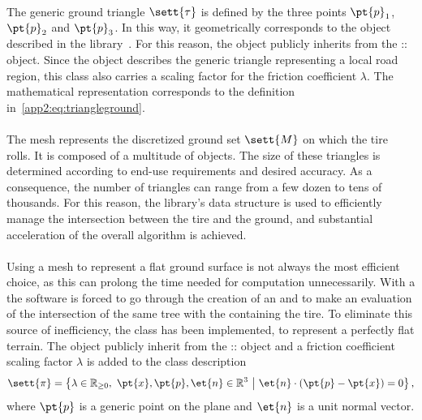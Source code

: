\paragraph{\TriangleGround{}}
The generic ground triangle $\sett{\tau}$ is defined by the three points $\pt{p}_1$, $\pt{p}_2$ and $\pt{p}_3$. In this way, it geometrically corresponds to the \Triangle{} object described in the \Acme{} library~\cite{stocco2021acme}. For this reason, the \TriangleGround{} object publicly inherits from the \Acme{}::\Triangle{} object. Since the \TriangleGround{} object describes the generic triangle representing a local road region, this class also carries a scaling factor for the friction coefficient $\lambda$. The mathematical representation corresponds to the definition in~\eqref{app2:eq:triangleground}.

\paragraph{\Mesh{}}
The mesh represents the discretized ground set $\sett{M}$ on which the tire rolls. It is composed of a multitude of \TriangleGround{} objects. The size of these triangles is determined according to end-use requirements and desired accuracy. As a consequence, the number of triangles can range from a few dozen to tens of thousands. For this reason, the \Acme{} library's \AabbTree{} data structure is used to efficiently manage the intersection between the tire and the ground, and substantial acceleration of the overall algorithm is achieved.

\paragraph{\Flat{}}
Using a mesh to represent a flat ground surface is not always the most efficient choice, as this can prolong the time needed for computation unnecessarily. With a \Mesh{} the software is forced to go through the creation of an \AabbTree{} and to make an evaluation of the intersection of the same tree with the \Aabb{} containing the tire. To eliminate this source of inefficiency, the \Flat{} class has been implemented, to represent a perfectly flat terrain. The \Flat{} object publicly inherit from the \Acme{}::\Plane{} object and a friction coefficient scaling factor $\lambda$ is added to the class description
%
\begin{equation*}
  \sett{\pi} = \big\{ \lambda \in \mathbb{R}_{\geq 0}, ~ \pt{x},\pt{p},\et{n} \in \mathbb{R}^3 ~ \big\lvert ~ \et{n} \cdot (\pt{p} - \pt{x}) = 0\big\}
   \, \text{,}
\end{equation*}
%
where $\pt{p}$ is a generic point on the plane and $\et{n}$ is a unit normal vector.


